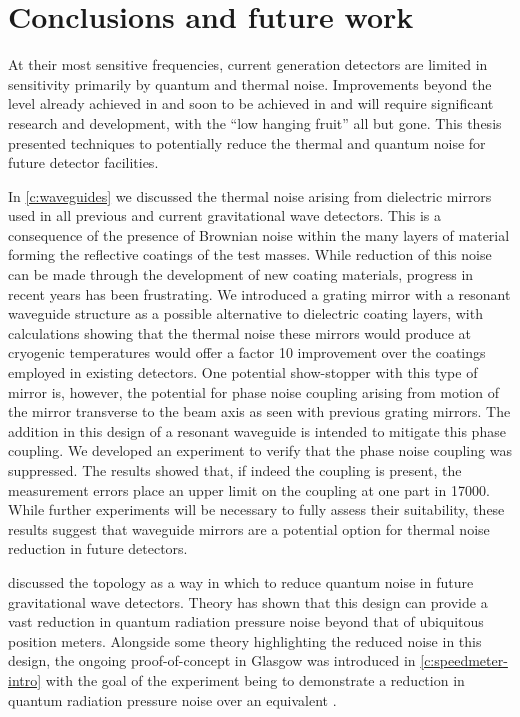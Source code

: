 \chapter{\label{c:conclusion}Conclusions and future work}

At their most sensitive frequencies, current generation detectors are limited in sensitivity primarily by quantum and thermal noise. Improvements beyond the level already achieved in \ALIGO{} and soon to be achieved in \AVIRGO{} and \KAGRA{} will require significant research and development, with the ``low hanging fruit'' all but gone. This thesis presented techniques to potentially reduce the thermal and quantum noise for future detector facilities.

In \cref{c:waveguides} we discussed the thermal noise arising from dielectric mirrors used in all previous and current gravitational wave detectors. This is a consequence of the presence of Brownian noise within the many layers of material forming the reflective coatings of the test masses. While reduction of this noise can be made through the development of new coating materials, progress in recent years has been frustrating. We introduced a grating mirror with a resonant waveguide structure as a possible alternative to dielectric coating layers, with calculations showing that the thermal noise these mirrors would produce at cryogenic temperatures would offer a factor \num{10} improvement over the coatings employed in existing detectors. One potential show-stopper with this type of mirror is, however, the potential for phase noise coupling arising from motion of the mirror transverse to the beam axis as seen with previous grating mirrors. The addition in this design of a resonant waveguide is intended to mitigate this phase coupling. We developed an experiment to verify that the phase noise coupling was suppressed. The results showed that, if indeed the coupling is present, the measurement errors place an upper limit on the coupling at one part in \num{17000}. While further experiments will be necessary to fully assess their suitability, these results suggest that waveguide mirrors are a potential option for thermal noise reduction in future detectors.

 discussed the \emph{\SM{}} topology as a way in which to reduce quantum noise in future gravitational wave detectors. Theory has shown that this design can provide a vast reduction in quantum radiation pressure noise beyond that of ubiquitous position meters. Alongside some theory highlighting the reduced noise in this design, the ongoing proof-of-concept \SSMEXPT{} in Glasgow was introduced in \cref{c:speedmeter-intro} with the goal of the experiment being to demonstrate a reduction in quantum radiation pressure noise over an equivalent \MI{}.


